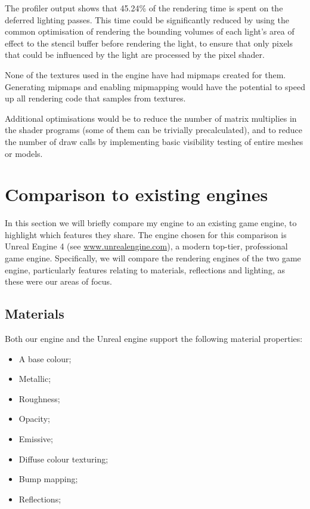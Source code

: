 \documentclass[11pt]{scrartcl} %
\begin{document}

    The profiler output shows that 45.24\% of the rendering time is spent on
    the deferred lighting passes. This time could be significantly reduced by
    using the common optimisation of rendering the bounding volumes of each
    light's area of effect to the stencil buffer before rendering the light, to
    ensure that only pixels that could be influenced by the light are processed
    by the pixel shader.


    None of the textures used in the engine have had mipmaps created for them.
    Generating mipmaps and enabling mipmapping would have the potential to
    speed up all rendering code that samples from textures.

    Additional optimisations would be to reduce the number of matrix multiplies
    in the shader programs (some of them can be trivially precalculated), and
    to reduce the number of draw calls by implementing basic visibility testing
    of entire meshes or models.

\section{Comparison to existing engines}

    In this section we will briefly compare my engine to an existing game
    engine, to highlight which features they share. The engine chosen for this
    comparison is Unreal Engine 4 (see \url{www.unrealengine.com}), a modern
    top-tier, professional game engine. Specifically, we will compare the
    rendering engines of the two game engine, particularly features relating to
    materials, reflections and lighting, as these were our areas of focus.

    \subsection{Materials}

        Both our engine and the Unreal engine support the following material properties:

        \begin{itemize}
            \item A base colour;
            \item Metallic;
            \item Roughness;
            \item Opacity;
            \item Emissive;
            \item Diffuse colour texturing;
            \item Bump mapping;
            \item Reflections;
        \end{itemize}
\end{document}

